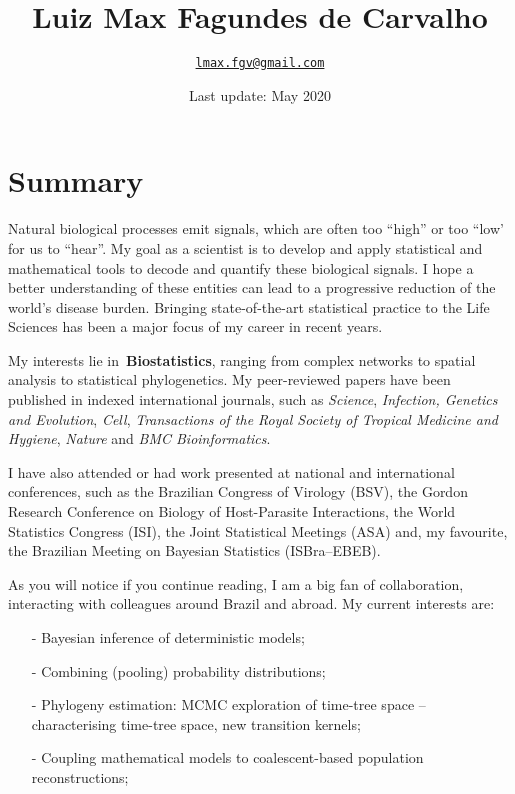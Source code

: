 \documentclass[10pt]{article}
\title{\bfseries Luiz Max Fagundes de Carvalho}
\author{\href{mailto:lmax.fgc@gmail.com}{\nolinkurl{lmax.fgv@gmail.com}}}
\affil{School of Applied Mathematics (EMAp), Get\'ulio Vargas Foundation, Brazil.}
\date{Last update: May 2020}
\begin{document}
\maketitle

\section*{Summary}

Natural biological processes emit signals, which are often too ``high'' or too ``low' for us to ``hear''.
My goal as a scientist is to develop and apply statistical and mathematical tools to decode and quantify these biological signals.
I hope a better understanding of these entities can lead to a progressive reduction of the world's disease burden.
Bringing state-of-the-art statistical practice to the Life Sciences has been a major focus of my career in recent years. 

My interests lie in~\textbf{Biostatistics}, ranging from complex networks to spatial analysis to statistical phylogenetics.
My peer-reviewed papers have been published in indexed international journals, such as \textit{Science}, \textit{Infection, Genetics and Evolution}, \textit{Cell}, \textit{Transactions of the Royal Society of Tropical Medicine and Hygiene}, \textit{Nature} and \textit{BMC Bioinformatics}.

I have also attended or had work presented at national and international conferences, such as the Brazilian Congress of Virology (BSV), the Gordon Research Conference on Biology of Host-Parasite Interactions, the World Statistics Congress (ISI), the Joint Statistical Meetings (ASA) and, my favourite, the Brazilian Meeting on Bayesian Statistics (ISBra--EBEB).

As you will notice if you continue reading, I am a big fan of collaboration, interacting with colleagues around Brazil and abroad.
My current interests are:
\begin{itemize}
\itemsep0.1em
 \item [-] Bayesian inference of deterministic models;
 \item [-] Combining (pooling) probability distributions;
 \item [-] Phylogeny estimation: MCMC exploration of time-tree space -- characterising time-tree space, new transition kernels;
 \item [-] Coupling mathematical models to coalescent-based population reconstructions;
\end{itemize}
\end{document}
